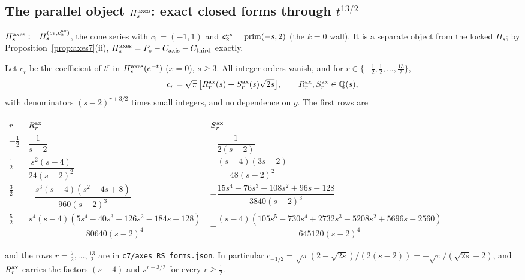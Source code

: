 \subsection{The parallel object $H_s^{\rm axes}$: exact closed forms through $t^{13/2}$}\label{sec:rev7axes}
\begin{definition}\label{def:axes7}
$H_s^{\rm axes}:=H_s^{(c_1,c_2^{\rm ax})}$, the cone series with $c_1=(-1,1)$ and $c_2^{\rm ax}=\mathrm{prim}(-s,2)$ (the $k=0$ wall). It is a separate object from the locked $H_s$; by Proposition~\ref{prop:axes7}(ii), $H_s^{\rm axes}=P_s-C_{\mathrm{axis}}-C_{\mathrm{third}}$ exactly.
\end{definition}
\begin{theorem}[\src{37}, \S7]\label{thm:axes7}
Let $c_r$ be the coefficient of $t^r$ in $H_s^{\rm axes}(e^{-t})$ ($x=0$), $s\ge3$. All integer orders vanish, and for $r\in\{-\tfrac12,\tfrac12,\dots,\tfrac{13}2\}$,
\[c_r=\sqrt\pi\,\big[R^{\rm ax}_r(s)+S^{\rm ax}_r(s)\sqrt{2s}\big],\qquad R^{\rm ax}_r,S^{\rm ax}_r\in\mathbb{Q}(s),\]
with denominators $(s-2)^{r+3/2}$ times small integers, and no dependence on $g$. The first rows are
\begin{center}\footnotesize
\setlength{\tabcolsep}{4pt}\begin{tabular}{lll}\toprule
$r$ & $R^{\rm ax}_r$ & $S^{\rm ax}_r$\\\midrule
$-\tfrac12$ & $\dfrac1{s-2}$ & $-\dfrac1{2(s-2)}$\\[1ex]
$\tfrac12$ & $\dfrac{s^2(s-4)}{24(s-2)^2}$ & $-\dfrac{(s-4)(3s-2)}{48(s-2)^2}$\\[1ex]
$\tfrac32$ & $-\dfrac{s^3(s-4)(s^2-4s+8)}{960(s-2)^3}$ & $-\dfrac{15s^4-76s^3+108s^2+96s-128}{3840(s-2)^3}$\\[1ex]
$\tfrac52$ & $\dfrac{s^4(s-4)(5s^4-40s^3+126s^2-184s+128)}{80640(s-2)^4}$ & $-\dfrac{(s-4)(105s^5-730s^4+2732s^3-5208s^2+5696s-2560)}{645120(s-2)^4}$\\\bottomrule
\end{tabular}
\end{center}
and the rows $r=\tfrac72,\dots,\tfrac{13}2$ are in \texttt{c7/axes\_RS\_forms.json}. In particular $c_{-1/2}=\sqrt\pi(2-\sqrt{2s})/(2(s-2))=-\sqrt\pi/(\sqrt{2s}+2)$, and $R^{\rm ax}_r$ carries the factors $(s-4)$ and $s^{r+3/2}$ for every $r\ge\tfrac12$.
\end{theorem}

